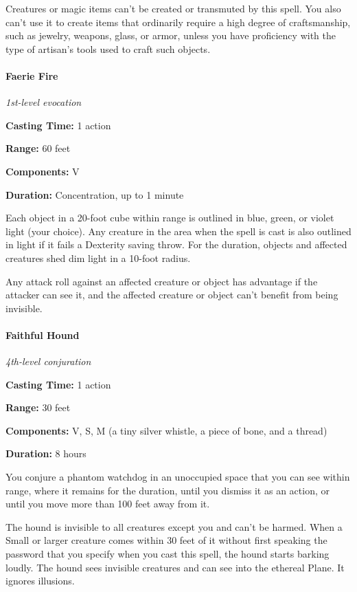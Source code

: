 \documentclass[
]{article}
\begin{document}
Creatures or magic items can't be created or transmuted by this spell.
You also can't use it to create items that ordinarily require a high
degree of craftsmanship, such as jewelry, weapons, glass, or armor,
unless you have proficiency with the type of artisan's tools used to
craft such objects.

\hypertarget{faerie-fire}{%
\paragraph{Faerie Fire}\label{faerie-fire}}

\emph{1st-level evocation}

\textbf{Casting Time:} 1 action

\textbf{Range:} 60 feet

\textbf{Components:} V

\textbf{Duration:} Concentration, up to 1 minute

Each object in a 20-foot cube within range is outlined in blue, green,
or violet light (your choice). Any creature in the area when the spell
is cast is also outlined in light if it fails a Dexterity saving throw.
For the duration, objects and affected creatures shed dim light in a
10-foot radius.

Any attack roll against an affected creature or object has advantage if
the attacker can see it, and the affected creature or object can't
benefit from being invisible.

\hypertarget{faithful-hound}{%
\paragraph{Faithful Hound}\label{faithful-hound}}

\emph{4th-level conjuration}

\textbf{Casting Time:} 1 action

\textbf{Range:} 30 feet

\textbf{Components:} V, S, M (a tiny silver whistle, a piece of bone,
and a thread)

\textbf{Duration:} 8 hours

You conjure a phantom watchdog in an unoccupied space that you can see
within range, where it remains for the duration, until you dismiss it as
an action, or until you move more than 100 feet away from it.

The hound is invisible to all creatures except you and can't be harmed.
When a Small or larger creature comes within 30 feet of it without first
speaking the password that you specify when you cast this spell, the
hound starts barking loudly. The hound sees invisible creatures and can
see into the ethereal Plane. It ignores illusions.
\end{document}
